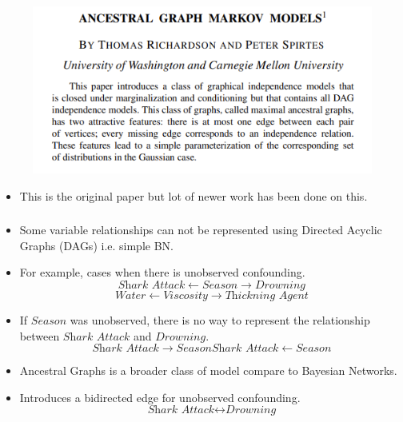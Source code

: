 \documentclass{beamer}
\begin{document}
\begin{frame}
	\frametitle{}
	\begin{figure}
		\includegraphics[scale=0.5]{imgs/mag.png}
	\end{figure}
	\begin{itemize}
		\item This is the original paper but lot of newer work has been done on this.
	\end{itemize}
\end{frame}
\begin{frame}
	\frametitle{}
	\begin{itemize}
		\item Some variable relationships can not be represented using Directed Acyclic Graphs (DAGs) i.e. simple BN.
		\item For example, cases when there is unobserved confounding.
			$$ \textit{Shark Attack} \leftarrow \textit{Season} \rightarrow \textit{Drowning} $$
			$$ \textit{Water} \leftarrow \textit{Viscosity} \rightarrow \textit{Thickning Agent} $$
		\item If $ \textit{Season} $ was unobserved, there is no way to represent the relationship between $ \textit{Shark Attack} $ and $ \textit{Drowning} $.
			$$ \textit{Shark Attack} \rightarrow \textit{Season} \textit{Shark Attack} \leftarrow \textit{Season} $$
		\item Ancestral Graphs is a broader class of model compare to Bayesian Networks.
		\item Introduces a bidirected edge for unobserved confounding.
			$$ \textit{Shark Attack} \leftrightarrow \textit{Drowning} $$
	\end{itemize}
\end{frame}
\end{document}
